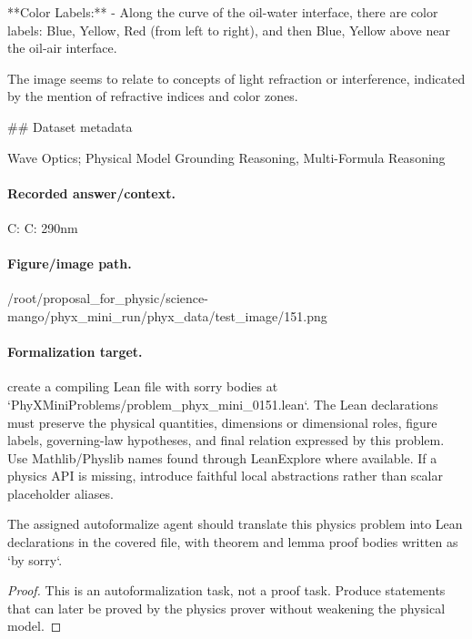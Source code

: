 **Color Labels:**
- Along the curve of the oil-water interface, there are color labels: Blue, Yellow, Red (from left to right), and then Blue, Yellow above near the oil-air interface.

The image seems to relate to concepts of light refraction or interference, indicated by the mention of refractive indices and color zones.

\#\# Dataset metadata

Wave Optics; Physical Model Grounding Reasoning, Multi-Formula Reasoning

\paragraph{Recorded answer/context.}
C: C: 290nm

\paragraph{Figure/image path.}
/root/proposal\_for\_physic/science-mango/phyx\_mini\_run/phyx\_data/test\_image/151.png

\paragraph{Formalization target.}
create a compiling Lean file with sorry bodies at `PhyXMiniProblems/problem\_phyx\_mini\_0151.lean`. The Lean declarations must preserve the physical quantities, dimensions or dimensional roles, figure labels, governing-law hypotheses, and final relation expressed by this problem.
Use Mathlib/Physlib names found through LeanExplore where available. If a physics API is missing, introduce faithful local abstractions rather than scalar placeholder aliases.

\begin{theorem}
\label{thm:physics:phyx_mini_0151:target}
The assigned autoformalize agent should translate this physics problem into Lean declarations in the covered file, with theorem and lemma proof bodies written as `by sorry`.
\end{theorem}
\begin{proof}
This is an autoformalization task, not a proof task. Produce statements that can later be proved by the physics prover without weakening the physical model.
\end{proof}


